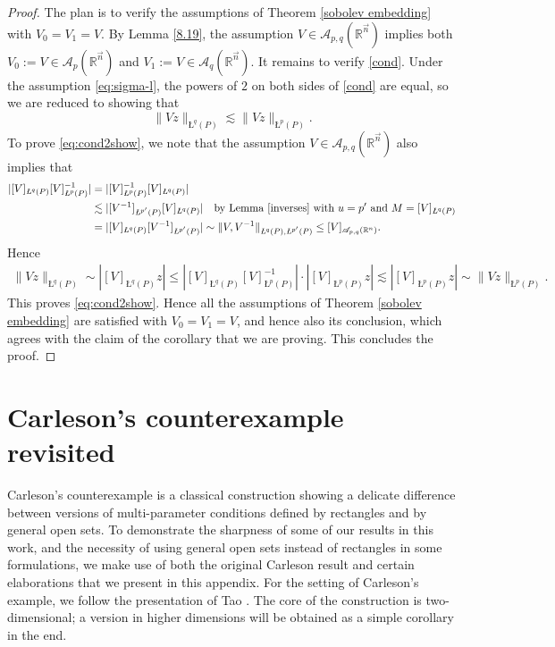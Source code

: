 \documentclass[11pt, reqno]{amsart}
\theoremstyle{definition}
\theoremstyle{remark}
\numberwithin{equation}{section}
\newcommand{\A}{\mathscr A}
\newcommand{\R}{\mathbb R}
\newcommand{\vn}{\vec n}
\newcommand{\aveL}{\textit{\L}}
\newcommand{\abs}[1]{|#1|}
\newcommand{\Norm}[2]{\|#1\|_{#2}}
\begin{document}
\begin{proof}
The plan is to verify the assumptions of Theorem \ref{sobolev embedding} with $V_0=V_1=V$. By Lemma \ref{8.19}, the assumption $V\in\A_{p,q}(\R^{\vn})$ implies both $V_0:=V\in\A_p(\R^{\vn})$ and $V_1:=V\in\A_q(\R^{\vn})$. It remains to verify \eqref{cond}. Under the assumption \eqref{eq:sigma-l}, the powers of $2$ on both sides of \eqref{cond} are equal, so we are reduced to showing that
\begin{equation}\label{eq:cond2show}
  \Norm{Vz}{\aveL^q(P)}\lesssim\Norm{Vz}{\aveL^p(P)}.
\end{equation}
To prove \eqref{eq:cond2show}, we note that the assumption $V\in\A_{p,q}(\R^{\vn})$ also implies that
\begin{equation*}
\begin{split}
  \abs{[V]_{\aveL^q(P)}[V]_{\aveL^p(P)}^{-1}}
  &=\abs{[V]_{\aveL^p(P)}^{-1}[V]_{\aveL^q(P)}} \\
  &\lesssim\abs{[V^{-1}]_{\aveL^{p'}(P)}[V]_{\aveL^q(P)}}
  \quad\text{by Lemma \ref{inverses} with $u=p'$ and }M=[V]_{\aveL^q(P)} \\
  &=\abs{[V]_{\aveL^q(P)}[V^{-1}]_{\aveL^{p'}(P)}}
  \sim\Norm{V,V^{-1}}{\aveL^q(P),\aveL^{p'}(P)}\leq[V]_{\A_{p,q}(\R^n)}.
\end{split}
\end{equation*}
Hence
\begin{equation*}
\begin{split}
  \Norm{V z}{\aveL^{q}(P)}
  \sim\abs{[V]_{\aveL^q(P)}z}
  \leq\abs{[V]_{\aveL^q(P)}[V]_{\aveL^p(P)}^{-1}}\cdot\abs{[V]_{\aveL^p(P)}z}
  \lesssim\abs{[V]_{\aveL^p(P)}z} \sim\Norm{V z}{\aveL^p(P)}.
\end{split}
\end{equation*}
This proves \eqref{eq:cond2show}. Hence all the assumptions of Theorem \ref{sobolev embedding} are satisfied with $V_0=V_1=V$, and hence also its conclusion, which agrees with the claim of the corollary that we are proving. This concludes the proof.
\end{proof}

\appendix

\section{Carleson's counterexample revisited}\label{app:Carleson}

Carleson's counterexample \cite{Car} is a classical construction showing a delicate difference between versions of multi-parameter conditions defined by rectangles and by general open sets. To demonstrate the sharpness of some of our results in this work, and the necessity of using general open sets instead of rectangles in some formulations, we make use of both the original Carleson result and certain elaborations that we present in this appendix. For the setting of Carleson's example, we follow the presentation of Tao \cite{Tao}. The core of the construction is two-dimensional; a version in higher dimensions will be obtained as a simple corollary in the end.
\end{document}
